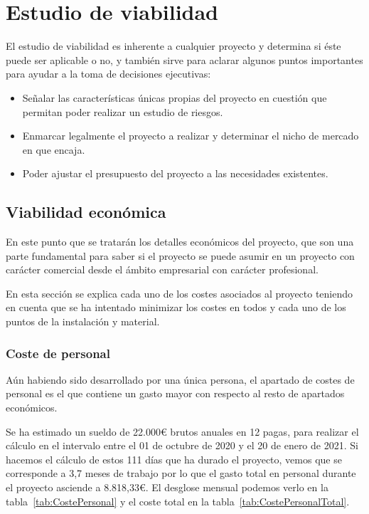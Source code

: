 \section{Estudio de viabilidad}
El estudio de viabilidad es inherente a cualquier proyecto y determina si éste puede ser aplicable o no, y también sirve para aclarar algunos puntos importantes para ayudar a la toma de decisiones ejecutivas:
\begin{itemize}
    \item Señalar las características únicas propias del proyecto en cuestión que permitan poder realizar un estudio de riesgos.
    \item Enmarcar legalmente el proyecto a realizar y determinar el nicho de mercado en que encaja.
    \item Poder ajustar el presupuesto del proyecto a las necesidades existentes.
\end{itemize}

\subsection{Viabilidad económica}
En este punto que se tratarán los detalles económicos del proyecto, que son una parte fundamental para saber si el proyecto se puede asumir en un proyecto con carácter comercial desde el ámbito empresarial con carácter profesional.

En esta sección se explica cada uno de los costes asociados al proyecto teniendo en cuenta que se ha intentado minimizar los costes en todos y cada uno de los puntos de la instalación y material.

\subsubsection{Coste de personal}
Aún habiendo sido desarrollado por una única persona, el apartado de costes de personal es el que contiene un gasto mayor con respecto al resto de apartados económicos.

Se ha estimado un sueldo de 22.000€ brutos anuales en 12 pagas, para realizar el cálculo en el intervalo entre el 01 de octubre de 2020 y el 20 de enero de 2021. Si hacemos el cálculo de estos 111 días que ha durado el proyecto, vemos que se corresponde a 3,7 meses de trabajo por lo que el gasto total en personal durante el proyecto asciende a 8.818,33€.
El desglose mensual podemos verlo en la tabla~\ref{tab:CostePersonal} y el coste total en la tabla~\ref{tab:CostePersonalTotal}.~\\~\\~\\~\\ %

